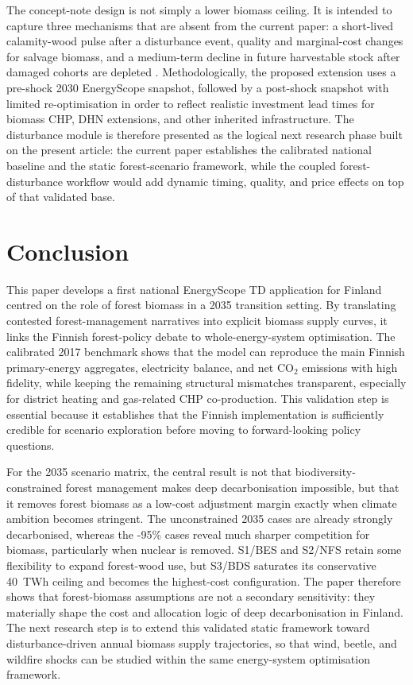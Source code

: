 \documentclass{article}
\begin{document}
The concept-note design is not simply a lower biomass ceiling. It is intended to capture three mechanisms that are absent from the current paper: a short-lived calamity-wood pulse after a disturbance event, quality and marginal-cost changes for salvage biomass, and a medium-term decline in future harvestable stock after damaged cohorts are depleted \citep{tothImpactsCalamityLogging2020,reckaRoleBiomassDecarbonisation2023}. Methodologically, the proposed extension uses a pre-shock 2030 EnergyScope snapshot, followed by a post-shock snapshot with limited re-optimisation in order to reflect realistic investment lead times for biomass CHP, DHN extensions, and other inherited infrastructure. The disturbance module is therefore presented as the logical next research phase built on the present article: the current paper establishes the calibrated national baseline and the static forest-scenario framework, while the coupled forest-disturbance workflow would add dynamic timing, quality, and price effects on top of that validated base.


\section{Conclusion}
\label{sec:conclusion}

This paper develops a first national EnergyScope TD application for Finland centred on the role of forest biomass in a 2035 transition setting. By translating contested forest-management narratives into explicit biomass supply curves, it links the Finnish forest-policy debate to whole-energy-system optimisation. The calibrated 2017 benchmark shows that the model can reproduce the main Finnish primary-energy aggregates, electricity balance, and net CO$_2$ emissions with high fidelity, while keeping the remaining structural mismatches transparent, especially for district heating and gas-related CHP co-production. This validation step is essential because it establishes that the Finnish implementation is sufficiently credible for scenario exploration before moving to forward-looking policy questions.

For the 2035 scenario matrix, the central result is not that biodiversity-constrained forest management makes deep decarbonisation impossible, but that it removes forest biomass as a low-cost adjustment margin exactly when climate ambition becomes stringent. The unconstrained 2035 cases are already strongly decarbonised, whereas the -95\% cases reveal much sharper competition for biomass, particularly when nuclear is removed. S1/BES and S2/NFS retain some flexibility to expand forest-wood use, but S3/BDS saturates its conservative 40~TWh ceiling and becomes the highest-cost configuration. The paper therefore shows that forest-biomass assumptions are not a secondary sensitivity: they materially shape the cost and allocation logic of deep decarbonisation in Finland. The next research step is to extend this validated static framework toward disturbance-driven annual biomass supply trajectories, so that wind, beetle, and wildfire shocks can be studied within the same energy-system optimisation framework.







\end{document}
